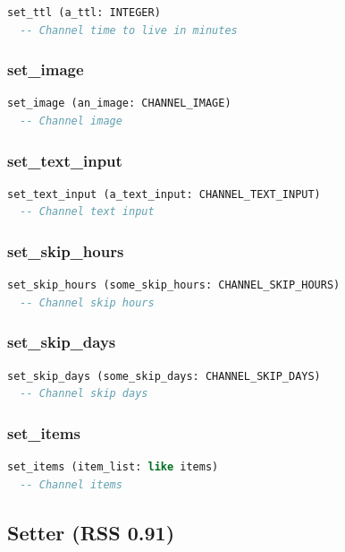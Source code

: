 \begin{lstlisting}[language=Eiffel]
set_ttl (a_ttl: INTEGER)
  -- Channel time to live in minutes
\end{lstlisting}

\subsubsection{set\_image}

\begin{lstlisting}[language=Eiffel]
set_image (an_image: CHANNEL_IMAGE)
  -- Channel image
\end{lstlisting}

\subsubsection{set\_text\_input}

\begin{lstlisting}[language=Eiffel]
set_text_input (a_text_input: CHANNEL_TEXT_INPUT)
  -- Channel text input
\end{lstlisting}

\subsubsection{set\_skip\_hours}

\begin{lstlisting}[language=Eiffel]
set_skip_hours (some_skip_hours: CHANNEL_SKIP_HOURS)
  -- Channel skip hours
\end{lstlisting}

\subsubsection{set\_skip\_days}

\begin{lstlisting}[language=Eiffel]
set_skip_days (some_skip_days: CHANNEL_SKIP_DAYS)
  -- Channel skip days 
\end{lstlisting}

\subsubsection{set\_items}

\begin{lstlisting}[language=Eiffel]
set_items (item_list: like items)
  -- Channel items
\end{lstlisting}

\subsection{Setter (RSS 0.91)}
\label{sec:channel-setter-rss091}

